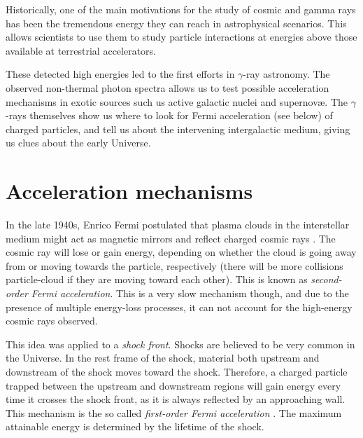 


Historically, one of the main motivations for the study of cosmic and
gamma rays has been the tremendous energy they can reach in
astrophysical scenarios. This allows scientists to use them to study
particle interactions at energies above those available at terrestrial
accelerators.

These detected high energies led to the first efforts in $\gamma$-ray
astronomy. The observed non-thermal photon spectra allows us to test
possible acceleration mechanisms in exotic sources such us active
galactic nuclei and supernov{\ae}. The $\gamma$-rays themselves show us
where to look for Fermi acceleration (see below) of charged particles,
and tell us about the intervening intergalactic medium, giving us
clues about the early Universe.


\section{Acceleration mechanisms}
\label{sec:accel}

In the late 1940s, Enrico Fermi postulated that plasma clouds in the
interstellar medium might act as magnetic mirrors and reflect charged
cosmic rays \cite{XXX}.  The cosmic ray will lose or gain energy,
depending on whether the cloud is going away from or moving towards the
particle, respectively (there will be more collisions particle-cloud
if they are moving toward each other).  This is known as
\emph{second-order Fermi acceleration}.  This is a very slow mechanism
though, and due to the presence of multiple energy-loss processes, it
can not account for the high-energy cosmic rays observed.

This idea was applied to a \emph{shock front}.  Shocks are believed to
be very common in the Universe.  In the rest frame of the shock,
material both upstream and downstream of the shock moves toward the
shock.  Therefore, a charged particle trapped between the upstream and
downstream regions will gain energy every time it crosses the shock
front, as it is always reflected by an approaching wall.  This
mechanism is the so called \emph{first-order Fermi acceleration}
\cite{XXX}.  The maximum attainable energy is determined by the
lifetime of the shock.
 
